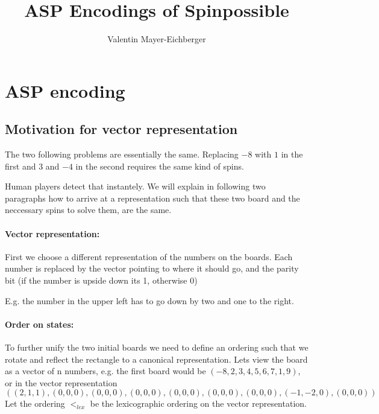 \documentclass[]{llncs}
\author{Valentin Mayer-Eichberger}
\institute{IVU Traffice Technologies\\
Bundesallee 88, 12000 Berlin\\
\email{vme@ivu.de}}
\title{ASP Encodings of Spinpossible}
\newcommand{\spintable}[9]{
\node [matrix,ampersand replacement=\&,nodes={minimum size=4mm}]%
    {
    \node {#1}; \& \node{#2}; \& \node {#3}; \\
    \node {#4}; \& \node{#5}; \& \node {#6}; \\
    \node {#7}; \& \node{#8}; \& \node {#9}; \\
    };
}
\begin{document}
\maketitle

\section{ASP encoding}



\subsection{Motivation for vector representation}

The two following problems are essentially the same. Replacing $-8$ with $1$ in the first and $3$ and $-4$ in the second requires
the same kind of spins. 


Human players detect that instantely. We will explain in following two paragraphs how to arrive at a representation such that these two board and the neccessary spins
to solve them, are the same. 

\paragraph{Vector representation: } First we choose a different representation of the numbers on the boards. Each
number is replaced by the vector pointing to where it should go, and the parity bit (if the number is upside
down its 1, otherwise 0)


E.g. the number in the upper left has to go down by two and one to the right. 


\paragraph{Order on states: }
To further unify the two initial boards we need to define an ordering such that we rotate and reflect the rectangle to
a canonical representation. Lets view the board as a vector of n numbers, e.g. the first board would be 
$(-8,2,3,4,5,6,7,1,9)$, or in the vector representation
\[
((2,1,1),(0,0,0),(0,0,0),(0,0,0),(0,0,0),(0,0,0),(0,0,0),(-1,-2,0),(0,0,0))
\]
Let the ordering $<_{lex}$ be the lexicographic ordering on the vector representation.
\end{document}
